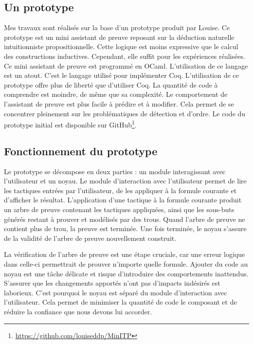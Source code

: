 \documentclass[titlepage,draft]{article}
\begin{document}
\subsection{Un prototype}
Mes travaux sont réalisés sur la base d'un prototype produit par Louise. Ce prototype est un mini assistant de preuve reposant sur la déduction naturelle intuitionniste propositionnelle. Cette logique est moins expressive que le calcul des constructions inductives. Cependant, elle suffit pour les expériences réalisées. Ce mini assistant de preuve est programmé en OCaml. L'utilisation de ce langage est un atout. C'est le langage utilisé pour implémenter Coq. L'utilisation de ce prototype offre plus de liberté que d'utiliser Coq. La quantité de code à comprendre est moindre, de même que sa complexité. Le comportement de l'assistant de preuve est plus facile à prédire et à modifier. Cela permet de se concentrer pleinement sur les problématiques de détection et d'ordre. Le code du prototype initial est disponible sur GitHub\footnote{\url{https://github.com/louiseddp/MinITP}}.

\subsection{Fonctionnement du prototype} \label{FonctionnementPrototype}
Le prototype se décompose en deux parties : un module interagissant avec l'utilisateur et un noyau. Le module d'interaction avec l'utilisateur permet de lire les tactiques entrées par l'utilisateur, de les appliquer à la formule courante et d'afficher le résultat. L'application d'une tactique à la formule courante produit un arbre de preuve contenant les tactiques appliquées, ainsi que les sous-buts générés restant à prouver et modélisés par des trous. Quand l'arbre de preuve ne contient plus de trou, la preuve est terminée. Une fois terminée, le noyau s'assure de la validité de l'arbre de preuve nouvellement construit.

La vérification de l'arbre de preuve est une étape cruciale, car une erreur logique dans celle-ci permettrait de prouver n'importe quelle formule. Ajouter du code au noyau est une tâche délicate et risque d'introduire des comportements inattendus. S'assurer que les changements apportés n'ont pas d'impacts indésirés est laborieux. C'est pourquoi le noyau est séparé du module d'interaction avec l'utilisateur. Cela permet de minimiser la quantité de code le composant et de réduire la confiance que nous devons lui accorder.

\end{document}
